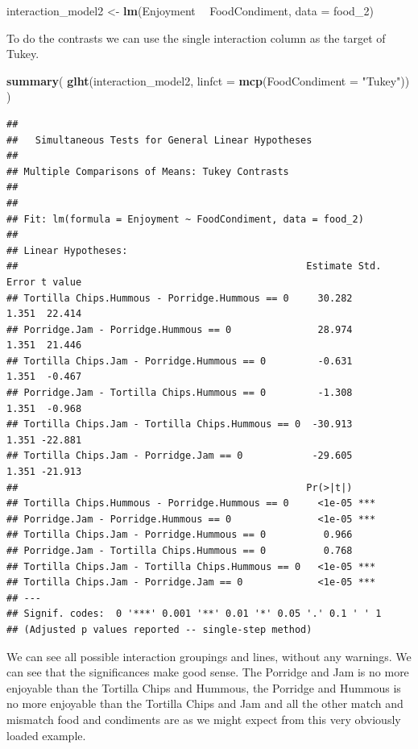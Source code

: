 \documentclass[
]{book}
\newenvironment{Shaded}{\begin{snugshade}}{\end{snugshade}}
\newcommand{\DataTypeTok}[1]{\textcolor[rgb]{0.13,0.29,0.53}{#1}}
\newcommand{\DecValTok}[1]{\textcolor[rgb]{0.00,0.00,0.81}{#1}}
\newcommand{\KeywordTok}[1]{\textcolor[rgb]{0.13,0.29,0.53}{\textbf{#1}}}
\newcommand{\NormalTok}[1]{#1}
\newcommand{\OperatorTok}[1]{\textcolor[rgb]{0.81,0.36,0.00}{\textbf{#1}}}
\newcommand{\StringTok}[1]{\textcolor[rgb]{0.31,0.60,0.02}{#1}}
\begin{document}
\begin{Shaded}
\begin{Highlighting}[]
\NormalTok{interaction_model2 <-}\StringTok{ }\KeywordTok{lm}\NormalTok{(Enjoyment }\OperatorTok{~}\StringTok{ }\NormalTok{FoodCondiment, }\DataTypeTok{data =}\NormalTok{ food_}\DecValTok{2}\NormalTok{)}
\end{Highlighting}
\end{Shaded}

To do the contrasts we can use the single interaction column as the target of Tukey.

\begin{Shaded}
\begin{Highlighting}[]
\KeywordTok{summary}\NormalTok{(}
  \KeywordTok{glht}\NormalTok{(interaction_model2, }\DataTypeTok{linfct =} \KeywordTok{mcp}\NormalTok{(}\DataTypeTok{FoodCondiment =} \StringTok{"Tukey"}\NormalTok{))}
\NormalTok{  )}
\end{Highlighting}
\end{Shaded}

\begin{verbatim}
## 
## 	 Simultaneous Tests for General Linear Hypotheses
## 
## Multiple Comparisons of Means: Tukey Contrasts
## 
## 
## Fit: lm(formula = Enjoyment ~ FoodCondiment, data = food_2)
## 
## Linear Hypotheses:
##                                                  Estimate Std. Error t value
## Tortilla Chips.Hummous - Porridge.Hummous == 0     30.282      1.351  22.414
## Porridge.Jam - Porridge.Hummous == 0               28.974      1.351  21.446
## Tortilla Chips.Jam - Porridge.Hummous == 0         -0.631      1.351  -0.467
## Porridge.Jam - Tortilla Chips.Hummous == 0         -1.308      1.351  -0.968
## Tortilla Chips.Jam - Tortilla Chips.Hummous == 0  -30.913      1.351 -22.881
## Tortilla Chips.Jam - Porridge.Jam == 0            -29.605      1.351 -21.913
##                                                  Pr(>|t|)    
## Tortilla Chips.Hummous - Porridge.Hummous == 0     <1e-05 ***
## Porridge.Jam - Porridge.Hummous == 0               <1e-05 ***
## Tortilla Chips.Jam - Porridge.Hummous == 0          0.966    
## Porridge.Jam - Tortilla Chips.Hummous == 0          0.768    
## Tortilla Chips.Jam - Tortilla Chips.Hummous == 0   <1e-05 ***
## Tortilla Chips.Jam - Porridge.Jam == 0             <1e-05 ***
## ---
## Signif. codes:  0 '***' 0.001 '**' 0.01 '*' 0.05 '.' 0.1 ' ' 1
## (Adjusted p values reported -- single-step method)
\end{verbatim}

We can see all possible interaction groupings and lines, without any warnings. We can see that the significances make good sense. The Porridge and Jam is no more enjoyable than the Tortilla Chips and Hummous, the Porridge and Hummous is no more enjoyable than the Tortilla Chips and Jam and all the other match and mismatch food and condiments are as we might expect from this very obviously loaded example.
\end{document}
